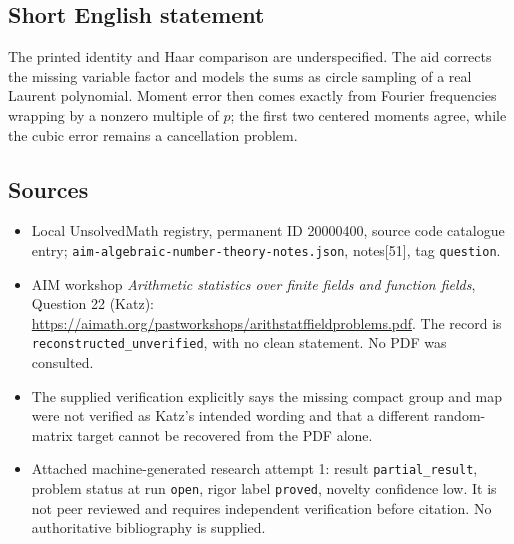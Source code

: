 \documentclass[11pt]{article}
\begin{document}
\subsection{Short English statement}
The printed identity and Haar comparison are underspecified. The aid corrects the missing variable factor and models the sums as circle sampling of a real Laurent polynomial. Moment error then comes exactly from Fourier frequencies wrapping by a nonzero multiple of $p$; the first two centered moments agree, while the cubic error remains a cancellation problem.
\subsection{Sources}
\begin{itemize}
\item Local UnsolvedMath registry, permanent ID 20000400, source code catalogue entry; \texttt{aim-algebraic-number-theory-notes.json}, notes[51], tag \texttt{question}.
\item AIM workshop \emph{Arithmetic statistics over finite fields and function fields}, Question 22 (Katz): \url{https://aimath.org/pastworkshops/arithstatffieldproblems.pdf}. The record is \texttt{reconstructed\_unverified}, with no clean statement. No PDF was consulted.
\item The supplied verification explicitly says the missing compact group and map were not verified as Katz's intended wording and that a different random-matrix target cannot be recovered from the PDF alone.
\item Attached machine-generated research attempt 1: result \texttt{partial\_result}, problem status at run \texttt{open}, rigor label \texttt{proved}, novelty confidence low. It is not peer reviewed and requires independent verification before citation. No authoritative bibliography is supplied.
\end{itemize}
\end{document}
